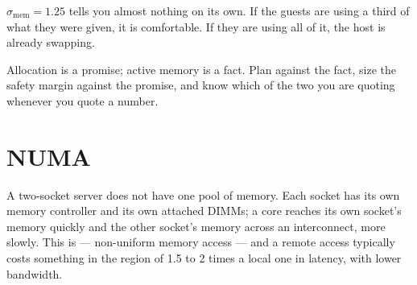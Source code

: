 \begin{alertbox}
$\sigma_{\text{mem}} = 1.25$ tells you almost nothing on its own. If the guests
are using a third of what they were given, it is comfortable. If they are using
all of it, the host is already swapping.

\smallskip
Allocation is a promise; active memory is a fact. Plan against the fact, size
the safety margin against the promise, and know which of the two you are
quoting whenever you quote a number.
\end{alertbox}

\section{NUMA}

A two-socket server does not have one pool of memory. Each socket has its own
memory controller and its own attached DIMMs; a core reaches its own socket's
memory quickly and the other socket's memory across an interconnect, more
slowly. This is  --- non-uniform memory access --- and a remote
access typically costs something in the region of 1.5 to 2 times a local one in
latency, with lower bandwidth.

